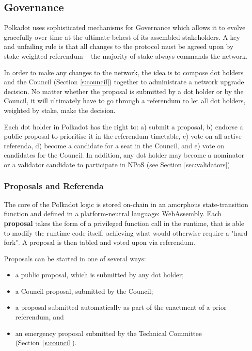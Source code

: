 \subsection{Governance}\label{sec:governance}

Polkadot uses sophisticated mechanisms for Governance which allows it to evolve gracefully over time at the ultimate behest of its assembled stakeholders. A key and unfailing rule is that all changes to the protocol must be agreed upon by stake-weighted referendum -- the majority of stake always commands the network.

In order to make any changes to the network, the idea is to compose dot holders and the Council (Section \ref{s:council}) together to administrate a network upgrade decision. No matter whether the proposal is submitted by a dot holder or by the Council, it will ultimately have to go through a referendum to let all dot holders, weighted by stake, make the decision.

Each dot holder in Polkadot has the right to: a) submit a proposal, b) endorse a public proposal to prioritise it in the referendum timetable, c) vote on all active referenda, d) become a candidate for a seat in the Council, and e) vote on candidates for the Council. In addition, any dot holder may become a nominator or a validator candidate to participate in NPoS (see Section \ref{sec:validators}).

\subsubsection{Proposals and Referenda}

The core of the Polkadot logic is stored on-chain in an amorphous state-transition function and defined in a platform-neutral language: WebAssembly. Each \textbf{proposal} takes the form of a privileged function call in the runtime, that is able to modify the runtime code itself, achieving what would otherwise require a "hard fork". A proposal is then tabled and voted upon via referendum. 

Proposals can be started in one of several ways:
\begin{itemize}
\item a public proposal, which is submitted by any dot holder;
\item a Council proposal, submitted by the Council;
\item a proposal submitted automatically as part of the enactment of a prior referendum, and
\item an emergency proposal submitted by the Technical Committee (Section~\ref{s:council}).
\end{itemize} 

